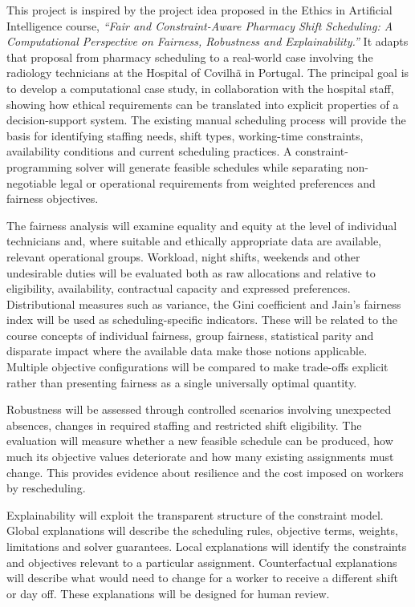 \documentclass[11pt,a4paper]{article}
\begin{document}
This project is inspired by the project idea proposed in the Ethics in Artificial Intelligence course, \emph{``Fair and Constraint-Aware Pharmacy Shift Scheduling: A Computational Perspective on Fairness, Robustness and Explainability.''} It adapts that proposal from pharmacy scheduling to a real-world case involving the radiology technicians at the Hospital of Covilh\~a in Portugal. The principal goal is to develop a computational case study, in collaboration with the hospital staff, showing how ethical requirements can be translated into explicit properties of a decision-support system. The existing manual scheduling process will provide the basis for identifying staffing needs, shift types, working-time constraints, availability conditions and current scheduling practices. A constraint-programming solver will generate feasible schedules while separating non-negotiable legal or operational requirements from weighted preferences and fairness objectives. 

The fairness analysis will examine equality and equity at the level of individual technicians and, where suitable and ethically appropriate data are available, relevant operational groups. Workload, night shifts, weekends and other undesirable duties will be evaluated both as raw allocations and relative to eligibility, availability, contractual capacity and expressed preferences. Distributional measures such as variance, the Gini coefficient and Jain's fairness index will be used as scheduling-specific indicators. These will be related to the course concepts of individual fairness, group fairness, statistical parity and disparate impact where the available data make those notions applicable. Multiple objective configurations will be compared to make trade-offs explicit rather than presenting fairness as a single universally optimal quantity.

Robustness will be assessed through controlled scenarios involving unexpected absences, changes in required staffing and restricted shift eligibility. The evaluation will measure whether a new feasible schedule can be produced, how much its objective values deteriorate and how many existing assignments must change. This provides evidence about resilience and the cost imposed on workers by rescheduling.

Explainability will exploit the transparent structure of the constraint model. Global explanations will describe the scheduling rules, objective terms, weights, limitations and solver guarantees. Local explanations will identify the constraints and objectives relevant to a particular assignment. Counterfactual explanations will describe what would need to change for a worker to receive a different shift or day off. These explanations will be designed for human review.
\end{document}
